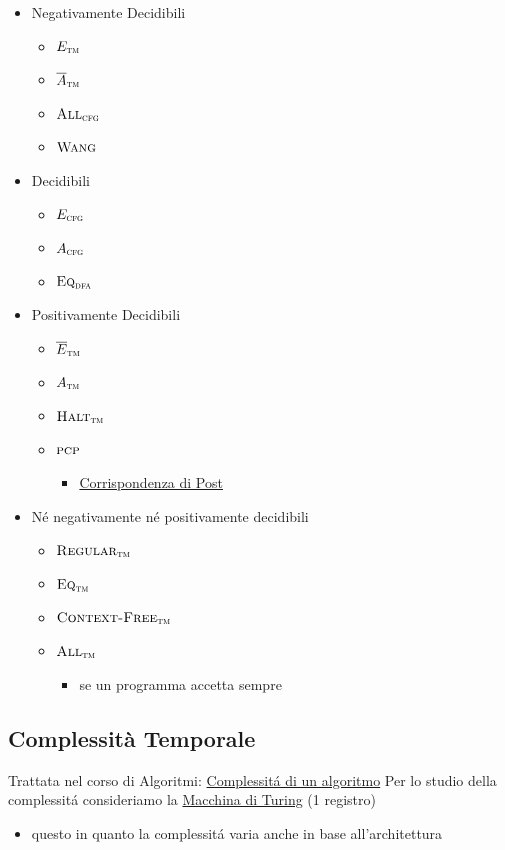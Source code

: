 \documentclass[
                        12pt, %
                        a4paper, %
                        oneside, %
                        headinclude,footinclude, %
                        BCOR5mm, %
                  ]{scrartcl}
\begin{document}
\begin{itemize}
\item Negativamente Decidibili
\begin{itemize}
\item \(E_{\textsc{tm}}\)
\item \(\overline A_{\textsc{tm}}\)
\item \(\textsc{All}_{\textsc{cfg}}\)
\item \(\textsc{Wang}\)
\end{itemize}
\item Decidibili
\begin{itemize}
\item \(E_{\textsc{cfg}}\)
\item \(A_{\textsc{cfg}}\)
\item \(\textsc{Eq}_{\textsc{dfa}}\)
\end{itemize}
\item Positivamente Decidibili
\begin{itemize}
\item \(\overline E_{\textsc{tm}}\)
\item \(A_{\textsc{tm}}\)
\item \(\textsc{Halt}_{\textsc{tm}}\)
\item \(\textsc{pcp}\)
\begin{itemize}
\item \hyperref[sec:org551e826]{Corrispondenza di Post}
\end{itemize}
\end{itemize}
\item Né negativamente né positivamente decidibili
\begin{itemize}
\item \(\textsc{Regular}_{\textsc{tm}}\)
\item \(\textsc{Eq}_{\textsc{tm}}\)
\item \(\textsc{Context-Free}_{\textsc{tm}}\)
\item \(\textsc{All}_{\textsc{tm}}\)
\begin{itemize}
\item se un programma accetta sempre
\end{itemize}
\end{itemize}
\end{itemize}
\subsection{Complessità Temporale}
\label{sec:orgc4f396b}
Trattata nel corso di Algoritmi: \href{20210414192358-problems_algorithms.org}{Complessitá di un algoritmo}
Per lo studio della complessitá consideriamo la \uline{Macchina di Turing} (1 registro)
\begin{itemize}
\item questo in quanto la complessitá varia anche in base all'architettura
\end{itemize}
\end{document}
